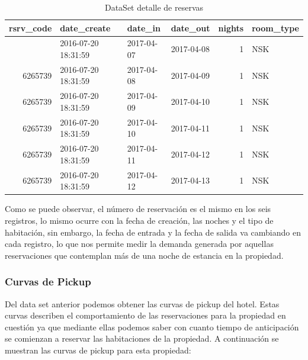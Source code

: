 \begin{knitrout}
\color{fgcolor}\begin{table}[H]
\centering{}

\begin{tabular}{r|l|l|l|r|l}
\hiderowcolors
\hline
rsrv\_code & date\_create & date\_in & date\_out & nights & room\_type\\
\hline
\showrowcolors
6265739 & 2016-07-20 18:31:59 & 2017-04-07 & 2017-04-08 & 1 & NSK\\
\hline
6265739 & 2016-07-20 18:31:59 & 2017-04-08 & 2017-04-09 & 1 & NSK\\
\hline
6265739 & 2016-07-20 18:31:59 & 2017-04-09 & 2017-04-10 & 1 & NSK\\
\hline
6265739 & 2016-07-20 18:31:59 & 2017-04-10 & 2017-04-11 & 1 & NSK\\
\hline
6265739 & 2016-07-20 18:31:59 & 2017-04-11 & 2017-04-12 & 1 & NSK\\
\hline
6265739 & 2016-07-20 18:31:59 & 2017-04-12 & 2017-04-13 & 1 & NSK\\
\hline
\end{tabular}
\caption{DataSet detalle de reservas} 
\end{table}
\end{knitrout}

Como se puede observar, el número de reservación es el mismo en los seis registros, lo mismo ocurre con la fecha de creación, las noches y el tipo de habitación, sin embargo, la fecha de entrada y la fecha de salida va cambiando en cada registro, lo que nos permite medir la demanda generada por aquellas reservaciones que contemplan más de una noche de estancia en la propiedad. 

\subsubsection*{Curvas de Pickup}

Del data set anterior podemos obtener las curvas de pickup del hotel. Estas curvas describen el comportamiento de las reservaciones para la propiedad en cuestión ya que mediante ellas podemos saber con cuanto tiempo de anticipación se comienzan a reservar las habitaciones de la propiedad. A continuación se muestran las curvas de pickup para esta propiedad:

